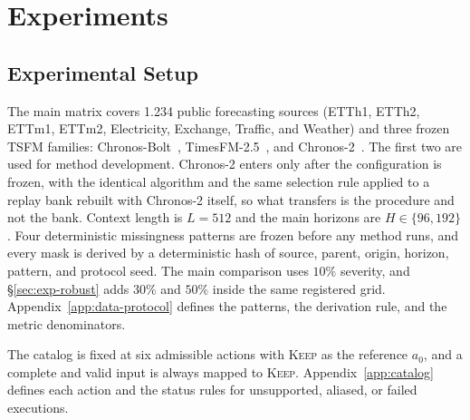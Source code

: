 \documentclass{article}
\newcommand{\tsfm}{TSFM}
\begin{document}
\section{Experiments}
\label{sec:exp}

\subsection{Experimental Setup}
\label{sec:exp-setup}
The main matrix covers 1.234 public forecasting sources (ETTh1, ETTh2, ETTm1, ETTm2,
Electricity, Exchange, Traffic, and Weather) and three frozen \tsfm{} families:
Chronos-Bolt~\citep{chronosbolt2025}, TimesFM-2.5~\citep{das2024timesfm}, and
Chronos-2~\citep{chronos2_2025}. The first two are used for method development. Chronos-2
enters only after the configuration is frozen, with the identical algorithm and the same
selection rule applied to a replay bank rebuilt with Chronos-2 itself, so what transfers is the
procedure and not the bank.
Context length is $L = 512$ and the main horizons are $H \in \{96, 192\}$. Four deterministic
missingness patterns are frozen before any method runs, and every mask is derived by a
deterministic hash of source, parent, origin, horizon, pattern, and protocol seed. The main
comparison uses $10\%$ severity, and \S\ref{sec:exp-robust} adds $30\%$ and $50\%$ inside the
same registered grid. Appendix~\ref{app:data-protocol} defines the patterns, the derivation
rule, and the metric denominators.

The catalog is fixed at six admissible actions with \textsc{Keep} as the reference $a_0$, and
a complete and valid input is always mapped to \textsc{Keep}. Appendix~\ref{app:catalog}
defines each action and the status rules for unsupported, aliased, or failed executions.
\end{document}
